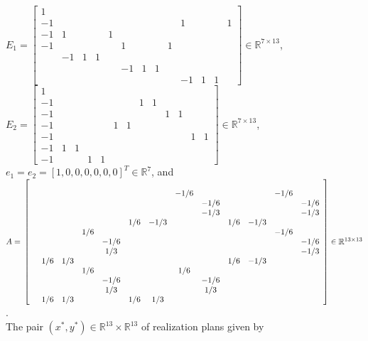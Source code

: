 \documentclass[envcountsame]{llncs} %
\begin{document}
$E_1 = \left[\begin{array}{ccccccccccccc}
1 &   &   &   &   &   &   &   &   &   &   &   &  \\
-1 &   &   &   &   &   &   &   &   & 1 &   &   & 1\\
-1 & 1 &   &   & 1 &   &   &   &   &   &   &   &  \\
-1 &   &   &   &   & 1 &   &   & 1 &   &   &   &  \\
  & -1 & 1 & 1 &   &   &   &   &   &   &   &   &  \\
  &   &   &   &   & -1 & 1 & 1 &   &   &   &   &  \\
  &   &   &   &   &   &   &   &   & -1 & 1 & 1 &  
\end{array}\right] \in \mathbb{R}^{7 \times 13}$,
$E_2 = \left[\begin{array}{ccccccccccccc}
1 &   &   &   &   &   &   &   &   &   &   &   &  \\
-1 &   &   &   &   &   &   & 1 & 1 &   &   &   &  \\
-1 &   &   &   &   &   &   &   &   & 1 & 1 &   &  \\
-1 &   &   &   &   & 1 & 1 &   &   &   &   &   &  \\
-1 &   &   &   &   &   &   &   &   &   &   & 1 & 1\\
-1 & 1 & 1 &   &   &   &   &   &   &   &   &   &  \\
-1 &   &   & 1 & 1 &   &   &   &   &   &   &   &  
\end{array}\right] \in \mathbb{R}^{7 \times 13}$, $e_1 = e_2 = [1, 0,
  0, 0, 0, 0, 0]^T \in \mathbb{R}^7$, and $A =
\\\left[\begin{array}{ccccccccccccc}

  &   &   &   &   &   &   &   &   &   &   &   &  \\
  &   &   &   &   &   &   & -1 / 6 &   &   &   & -1 / 6 &  \\
  &   &   &   &   &   &   &   & -1 / 6 &   &   &   & -1 / 6\\
  &   &   &   &   &   &   &   & -1 / 3 &   &   &   & -1 / 3\\
  &   &   &   &   & 1 / 6 & -1 / 3 &   &   & 1 / 6 & -1 / 3 &   &  \\
  &   &   & 1 / 6 &   &   &   &   &   &   &   & -1 / 6 &  \\
  &   &   &   & -1 / 6 &   &   &   &   &   &   &   & -1 / 6\\
  &   &   &   & 1 / 3 &   &   &   &   &   &   &   & -1 / 3\\
  & 1 / 6 & 1 / 3 &   &   &   &   &   &   & 1 / 6 & -1 / 3 &   &  \\
  &   &   & 1 / 6 &   &   &   & 1 / 6 &   &   &   &   &  \\
  &   &   &   & -1 / 6 &   &   &   & -1 / 6 &   &   &   &  \\
  &   &   &   & 1 / 3 &   &   &   & 1 / 3 &   &   &   &  \\
  & 1 / 6 & 1 / 3 &   &   & 1 / 6 & 1 / 3 &   &   &   &   &   &  
\end{array}\right] \in \mathbb{R}^{13 \times 13}$.\\
The pair $(x^*, y^*) \in \mathbb{R}^{13} \times \mathbb{R}^{13}$ of
realization plans given by
\end{document}
